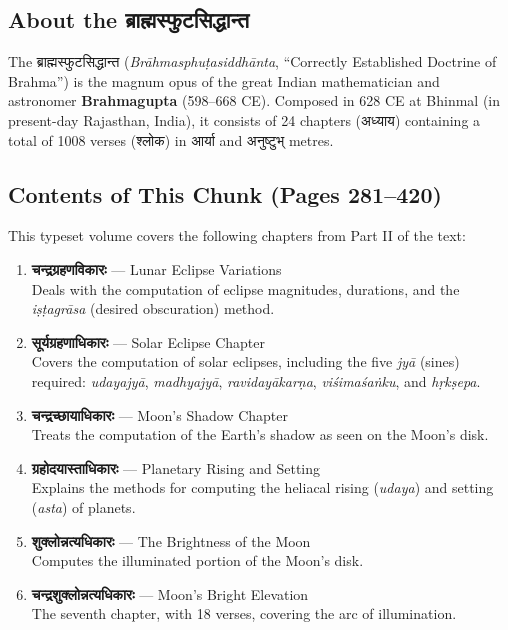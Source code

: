 \documentclass[11pt,a4paper]{article}
\newcommand{\dev}[1]{{\devanagarifont #1}}
\begin{document}
\subsection*{About the {\devanagarifont ब्राह्मस्फुटसिद्धान्त}}

The {\devanagarifont ब्राह्मस्फुटसिद्धान्त} (\textit{Brāhmasphuṭasiddhānta}, ``Correctly Established Doctrine of Brahma'') is the magnum opus of the great Indian mathematician and astronomer \textbf{Brahmagupta} (598--668 CE). Composed in 628 CE at Bhinmal (in present-day Rajasthan, India), it consists of 24 chapters ({\devanagarifont अध्याय}) containing a total of 1008 verses ({\devanagarifont श्लोक}) in {\devanagarifont आर्या} and {\devanagarifont अनुष्टुभ्} metres.

\subsection*{Contents of This Chunk (Pages 281--420)}

This typeset volume covers the following chapters from Part II of the text:

\begin{enumerate}
\item \textbf{\dev{चन्द्रग्रहणविकारः}} --- Lunar Eclipse Variations \\
  Deals with the computation of eclipse magnitudes, durations, and the \textit{iṣṭagrāsa} (desired obscuration) method.

\item \textbf{\dev{सूर्यग्रहणाधिकारः}} --- Solar Eclipse Chapter \\
  Covers the computation of solar eclipses, including the five \textit{jyā} (sines) required: \textit{udayajyā}, \textit{madhyajyā}, \textit{ravidayākarṇa}, \textit{viśimaśaṅku}, and \textit{hṛkṣepa}.

\item \textbf{\dev{चन्द्रच्छायाधिकारः}} --- Moon's Shadow Chapter \\
  Treats the computation of the Earth's shadow as seen on the Moon's disk.

\item \textbf{\dev{ग्रहोदयास्ताधिकारः}} --- Planetary Rising and Setting \\
  Explains the methods for computing the heliacal rising (\textit{udaya}) and setting (\textit{asta}) of planets.

\item \textbf{\dev{शुक्लोन्नत्यधिकारः}} --- The Brightness of the Moon \\
  Computes the illuminated portion of the Moon's disk.

\item \textbf{\dev{चन्द्रशुक्लोन्नत्यधिकारः}} --- Moon's Bright Elevation \\
  The seventh chapter, with 18 verses, covering the arc of illumination.
\end{enumerate}
\end{document}
